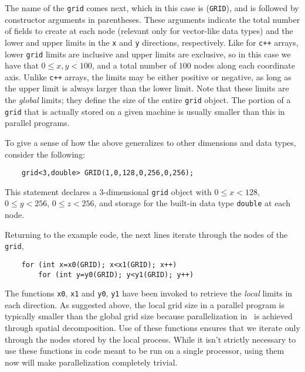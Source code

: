 The name of the {\tt grid} comes next, which in this case is ({\tt GRID}), and is followed by constructor arguments in parentheses.  These arguments indicate the total number of fields to create at each node (relevant only for vector-like data types) and the lower and upper limits in the {\tt x} and {\tt y} directions, respectively.  Like for {\tt c++} arrays, lower {\tt grid} limits are inclusive and upper limits are exclusive, so in this case we have that $0\leq x,y<100$, and a total number of $100$ nodes along each coordinate axis.  Unlike {\tt c++} arrays, the limits may be either positive or negative, as long as the upper limit is always larger than the lower limit.  Note that these limits are the {\em global} limits; they define the size of the entire {\tt grid} object.  The portion of a {\tt grid} that is actually stored on a given machine is usually smaller than this in parallel programs.

To give a sense of how the above generalizes to other dimensions and data types, consider the following:
\begin{shadebox}
\begin{verbatim}
    grid<3,double> GRID(1,0,128,0,256,0,256);
\end{verbatim}
\end{shadebox}
This statement declares a 3-dimensional {\tt grid} object with $0\leq x<128$, $0\leq y<256$, $0\leq z<256$, and storage for the built-in data type {\tt double} at each node.

Returning to the example code, the next lines iterate through the nodes of the {\tt grid},
\begin{shadebox}
\begin{verbatim}
    for (int x=x0(GRID); x<x1(GRID); x++)
        for (int y=y0(GRID); y<y1(GRID); y++)
\end{verbatim}
\end{shadebox}
The functions {\tt x0}, {\tt x1} and {\tt y0}, {\tt y1} have been invoked to retrieve the {\em local} limits in each direction.  As suggested above, the local grid size in a parallel program is typically smaller than the global grid size because parallelization in \MMSP\ is achieved through spatial decomposition.  Use of these functions ensures that we iterate only through the nodes stored by the local process.  While it isn't strictly necessary to use these functions in code meant to be run on a single processor, using them now will make parallelization completely trivial.

